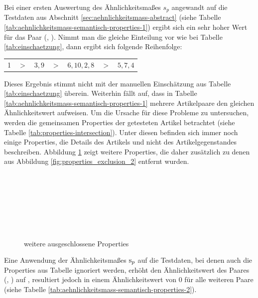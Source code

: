 Bei einer ersten Auswertung des Ähnlichkeitsmaßes $s_p$ angewandt auf die Testdaten aus Abschnitt \ref{sec:aehnlichkeitsmass-abstract} (siehe Tabelle \ref{tab:aehnlichkeitsmass-semantisch-properties-1})
ergibt sich ein sehr hoher Wert für das Paar (, ).
Nimmt man die gleiche Einteilung vor wie bei Tabelle \ref{tab:einschaetzung}, dann ergibt sich folgende Reihenfolge:
\begin{center}
\begin{tabular}{lllllll}
1	&$>$	&$3,9$	&$>$	&$6, 10, 2, 8$	&$>$ &$5,7,4$\\
\end{tabular}
\end{center}
Dieses Ergebnis stimmt nicht mit der manuellen Einschätzung aus Tabelle \ref{tab:einschaetzung} überein.
Weiterhin fällt auf, dass in Tabelle \ref{tab:aehnlichkeitsmass-semantisch-properties-1} mehrere Artikelpaare den gleichen Ähnlichkeitswert aufweisen.
Um die Ursache für diese Probleme zu untersuchen, werden die gemeinsamen Properties der getesteten Artikel betrachtet (siehe Tabelle \ref{tab:properties-intersection}).
Unter diesen befinden sich immer noch einige Properties, die Details des Artikels und nicht des Artikelgegenstandes beschreiben.
Abbildung \ref{tab:properties_exclusion_3} zeigt weitere Properties, die daher zusätzlich zu denen aus Abbildung \ref{fig:properties_exclusion_2} entfernt wurden.
\begin{figure}[H]
\\
\\
\\
\\
\\
\\
\caption{weitere ausgeschlossene Properties}
\label{tab:properties_exclusion_3}
\end{figure}

Eine Anwendung der Ähnlichkeitsmaßes $\textnormal{s}_p$ auf die Testdaten, bei denen auch die Properties aus Tabelle \label{tab:properties_exclusion_3} ignoriert werden, erhöht den Ähnlichkeitswert des Paares (, ) auf , resultiert jedoch
in einem Ähnlichkeitswert von 0 für alle weiteren Paare (siehe Tabelle \ref{tab:aehnlichkeitsmass-semantisch-properties-2}).

